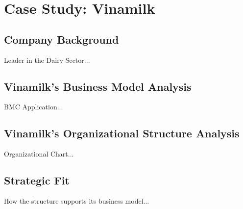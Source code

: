 \chapter{Case Study: Vinamilk}
\label{chap:vinamilk}

\section{Company Background}

Leader in the Dairy Sector...

\section{Vinamilk's Business Model Analysis}

BMC Application...

\section{Vinamilk's Organizational Structure Analysis}

Organizational Chart...

\section{Strategic Fit}

How the structure supports its business model...
